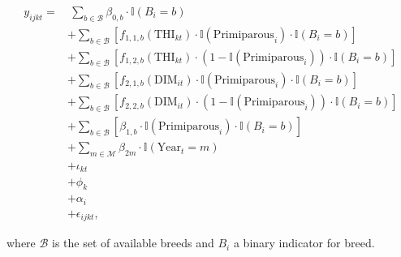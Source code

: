 \begin{defi}
\begin{equation}\label{eq:multi_breed_model_extended}
    \begin{aligned}
        y_{ijkt} = & \ \sum_{b \in \mathcal{B}} \beta_{0,b} \cdot \mathbb{I}(B_i = b) \\
        & + \sum_{b \in \mathcal{B}} \left[ f_{1,1,b}(\text{THI}_{kt}) \cdot \mathbb{I}(\text{Primiparous}_i) \cdot \mathbb{I}(B_i = b) \right] \\
        & + \sum_{b \in \mathcal{B}} \left[ f_{1,2,b}(\text{THI}_{kt}) \cdot (1 - \mathbb{I}(\text{Primiparous}_i)) \cdot \mathbb{I}(B_i = b) \right] \\
        & + \sum_{b \in \mathcal{B}} \left[ f_{2,1,b}(\text{DIM}_{it}) \cdot \mathbb{I}(\text{Primiparous}_i) \cdot \mathbb{I}(B_i = b) \right] \\
        & + \sum_{b \in \mathcal{B}} \left[ f_{2,2,b}(\text{DIM}_{it}) \cdot (1 - \mathbb{I}(\text{Primiparous}_i)) \cdot \mathbb{I}(B_i = b) \right] \\
        & + \sum_{b \in \mathcal{B}} \left[ \beta_{1,b} \cdot \mathbb{I}(\text{Primiparous}_i) \cdot \mathbb{I}(B_i = b) \right] \\
        & + \sum_{m \in \mathcal{M}} \beta_{2m} \cdot \mathbb{I}(\text{Year}_t = m) \\
        & + \iota_{kt} \\
        & + \phi_k \\
        & + \alpha_i \\
        & + \epsilon_{ijkt},
    \end{aligned}
\end{equation}
\end{defi}

where $\mathcal{B}$ is the set of available breeds and $B_i$ a binary indicator for breed.

